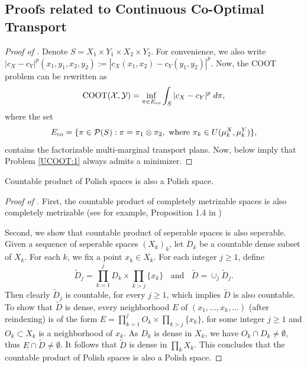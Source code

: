 \subsection{Proofs related to Continuous Co-Optimal Transport} \label{annex:cont_coot}

\begin{proof}[Proof of ]
  Denote $S = X_1 \times Y_1 \times X_2 \times Y_2$.
  For convenience, we also write
  $|c_X - c_Y|^p(x_1, y_1, x_2, y_2) := |c_X(x_1, x_2) - c_Y(y_1, y_2) |^p$.
  Now, the COOT problem can be rewritten as
  \begin{equation} \label{UCOOT:1}
    \text{COOT}(\mathcal X, \mathcal Y) = \inf_{\pi \in E_{co}} \int_{S} \vert c_X - c_Y \vert^p \; d\pi,
  \end{equation}
  where the set
  \begin{equation}
    E_{co} = \{ \pi \in \mathcal P(S): \pi = \pi_1 \otimes \pi_2,
    \text{ where } \pi_k \in U(\mu_k^X, \mu_k^Y) \},
  \end{equation}
  contains the factorizable multi-marginal transport plans.
  Now, 
  below imply that Problem \eqref{UCOOT:1} always admits a minimizer.
\end{proof}
\begin{lemma} \label{lemma:product_polish}
  Countable product of Polish spaces is also a Polish space.
\end{lemma}
\begin{proof}[Proof of ]
  First, the countable product of completely metrizable spaces is also completely metrizable
  (see for example, Proposition 1.4 in \citep{Dominique20})

  Second, we show that countable product of seperable spaces is also seperable.
  Given a sequence of seperable spaces $(X_k)_k$,
  let $D_k$ be a countable dense subset of $X_k$. For each $k$,
  we fix a point $x_k \in X_k$. For each integer $j \geq 1$, define
  \begin{equation}
    \widetilde{D}_j = \prod_{k=1}^j D_k \times \prod_{k > j} \{ x_k \}
    \;\; \text{ and } \;\;
    \widetilde{D} = \cup_{j} \widetilde{D}_j.
  \end{equation}
  Then clearly $\widetilde{D}_j$ is countable, for every $j \geq 1$,
  which implies $\widetilde{D}$ is also countable.
  To show that $\widetilde{D}$ is dense, every neighborhood $E$ of
  $(x_1, ..., x_k, ...)$ (after reindexing) is of the form
  $E = \prod_{k=1}^j O_k \times \prod_{k > j} \{ x_k \}$,
  for some integer $j \geq 1$ and $O_k \subset X_k$ is a neighborhood of $x_k$.
  As $D_k$ is dense in $X_k$, we have $O_k \cap D_k \neq \emptyset$,
  thus $E \cap \widetilde{D} \neq \emptyset$.
  It follows that $\widetilde{D}$ is dense in $\prod_k X_k$.
  This concludes that the countable product of Polish spaces is also a Polish space.
\end{proof}
